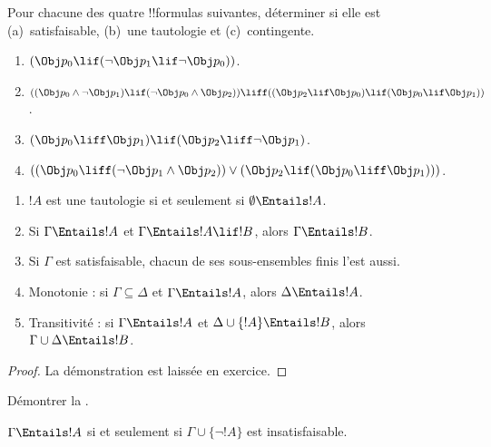 \documentclass[11pt,a4paper,openany]{memoir}
\begin{document}
\begin{prob}
Pour chacune des quatre !!{formula}s suivantes, déterminer si elle est
(a)~satisfaisable, (b)~une tautologie et (c)~contingente.
\begin{enumerate}
  \item \((\Obj p_0 \lif (\lnot \Obj p_1 \lif \lnot \Obj p_0))\).
  \item \(((\Obj p_0 \land \lnot \Obj p_1) \lif (\lnot \Obj p_0 \land \Obj p_2)) \liff ((\Obj p_2 \lif \Obj p_0) \lif (\Obj p_0 \lif \Obj p_1))\).
  \item \((\Obj p_0 \liff \Obj p_1) \lif (\Obj p_2 \liff \lnot \Obj p_1)\).
  \item \(((\Obj p_0 \liff (\lnot \Obj p_1 \land \Obj p_2)) \lor (\Obj p_2 \lif (\Obj p_0 \liff \Obj p_1)))\).
\end{enumerate}
\end{prob}

\begin{prop}
\begin{enumerate}
\item $!A$ est une tautologie si et seulement si
  $\emptyset \Entails !A$.
\item Si $\Gamma \Entails !A$ et $\Gamma \Entails !A \lif !B$,
  alors $\Gamma \Entails !B$.
\item Si $\Gamma$ est satisfaisable, chacun de ses sous-ensembles
  finis l'est aussi.
\item {} Monotonie : si
  $\Gamma \subseteq \Delta$ et $\Gamma \Entails !A$, alors
  $\Delta \Entails !A$.
\item {} Transitivité : si $\Gamma \Entails !A$ et
  $\Delta \cup \{!A\} \Entails !B$, alors
  $\Gamma \cup \Delta \Entails !B$.
\end{enumerate}
\end{prop}

\begin{proof}
La démonstration est laissée en exercice.
\end{proof}

\begin{prob}
Démontrer la .
\end{prob}

\begin{prop}
  $\Gamma \Entails !A$ si et seulement si
  $\Gamma \cup \{\lnot !A\}$ est insatisfaisable.
\end{prop}
\end{document}
